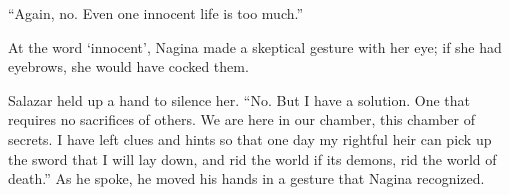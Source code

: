 “Again, no. Even one innocent life is too much.”

At the word ‘innocent’, Nagina made a skeptical gesture with her eye; if she had eyebrows, she would have cocked them.


Salazar held up a hand to silence her. “No. But I have a solution. One that requires no sacrifices of others. We are here in our chamber, this chamber of secrets. I have left clues and hints so that one day my rightful heir can pick up the sword that I will lay down, and rid the world if its demons, rid the world of death.” As he spoke, he moved his hands in a gesture that Nagina recognized.
\pagebreak


